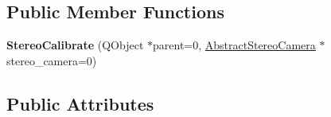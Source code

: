 \subsection*{Public Member Functions}
\begin{DoxyCompactItemize}
\item 
\hypertarget{class_stereo_calibrate_a0ba54ebc21eea32ab13ced8731dd4423}{}{\bfseries Stereo\+Calibrate} (Q\+Object $\ast$parent=0, \hyperlink{class_abstract_stereo_camera}{Abstract\+Stereo\+Camera} $\ast$stereo\+\_\+camera=0)\label{class_stereo_calibrate_a0ba54ebc21eea32ab13ced8731dd4423}

\end{DoxyCompactItemize}
\subsection*{Public Attributes}
